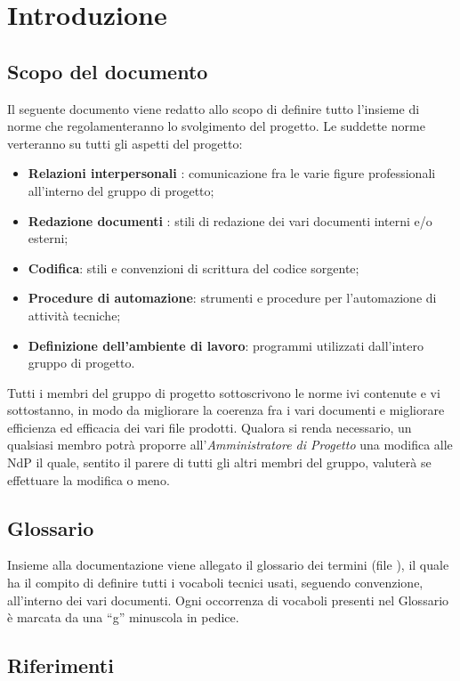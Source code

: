 \section{Introduzione}{
	\subsection{Scopo del documento}{
		Il seguente documento viene redatto allo scopo di definire tutto l’insieme di norme che regolamenteranno lo svolgimento del progetto. Le suddette norme verteranno su tutti gli aspetti del progetto:
		\begin{itemize}
        \item \textbf{Relazioni interpersonali} : comunicazione fra le varie figure professionali
		all’interno del gruppo di progetto;
		\item \textbf{Redazione documenti} : stili di redazione dei vari documenti interni e/o
		esterni;
		\item \textbf{Codifica}: stili e convenzioni di scrittura del codice sorgente;
		\item \textbf{Procedure di automazione}: strumenti e procedure per l’automazione
		di attività tecniche;
		\item \textbf{Definizione dell’ambiente di lavoro}: programmi utilizzati dall’intero
		gruppo di progetto.
		\end{itemize}
		Tutti i membri del gruppo di progetto sottoscrivono le norme ivi contenute e vi	sottostanno, in modo da migliorare la coerenza fra i vari documenti e migliorare efficienza ed efficacia dei vari file prodotti.
		Qualora si renda necessario, un qualsiasi membro potrà proporre all’\emph{Amministratore di Progetto} una modifica alle NdP il quale, sentito il parere di tutti gli altri membri del gruppo, valuterà se effettuare la modifica o meno.
		
	 }
	\subsection{Glossario}{ 
	Insieme alla documentazione viene allegato il glossario dei termini (file \href{run:../../Esterni/\fGlossario}{\fEscapeGlossario}), il quale ha il compito di definire tutti i vocaboli tecnici usati, seguendo convenzione, all’interno dei vari documenti.  Ogni occorrenza di vocaboli presenti nel Glossario è marcata da una “g” minuscola in pedice.	
	}
}
   \subsection{Riferimenti}
